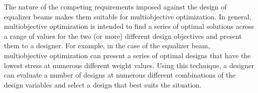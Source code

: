 The nature of the competing requirements imposed against the design of equalizer beams makes them suitable for multiobjective optimization. In general, multiobjective optimization is intended to find a series of optimal solutions across a range of values for the two (or more) different design objectives and present them to a designer. For example, in the case of the equalizer beam, multiobjective optimization can present a series of optimal designs that have the lowest stress at numerous different weight values.  Using this technique, a designer can evaluate a number of designs at numerous different combinations of the design variables and select a design that best suits the situation. 


